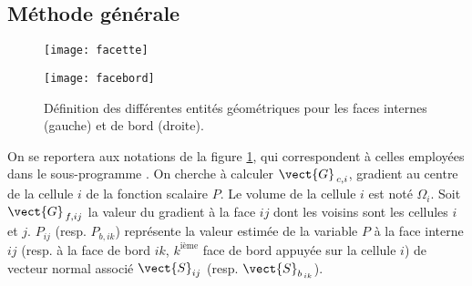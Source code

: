 \subsection{\bf M\'ethode g\'en\'erale}
\begin{figure}[h]
\parbox{8cm}{%
\centerline{\texttt{[image: facette]}}}
\parbox{8cm}{%
\centerline{\texttt{[image: facebord]}}}
\caption{\label{Base_Gradrc_fig_geom_gradmc}D\'efinition des diff\'erentes entit\'es
g\'eom\'etriques pour les faces internes (gauche) et de bord (droite).}
\end{figure}

On se reportera aux notations de la figure \ref{Base_Gradrc_fig_geom_gradmc}, qui
correspondent \`a celles employ\'ees dans le sous-programme .
On cherche \`a calculer $\vect{G}_{\,c,i}$, gradient au centre de la cellule $i$ de la
fonction scalaire $P$. Le volume de la cellule $i$ est not\'e $\Omega_i$.
 Soit $\vect{G}_{\,f,ij}$ la valeur  du gradient \`a la face $ij$ dont les voisins sont les cellules $i$ et $j$.
$P_{ij}$ (resp. $P_{b,ik}$) repr\'esente la valeur estim\'ee de la variable $P$
\`a la face interne $ij$ (resp. \`a la face de bord $ik$, $k^{\text{i\`eme}}$
face de bord appuy\'ee sur la cellule $i$) de vecteur normal associ\'e
$\vect{S}_{ij}$ (resp. $\vect{S}_{b_{\,ik}}$).

